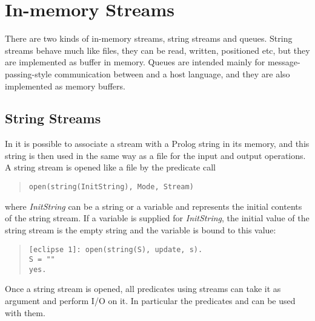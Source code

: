 \section{In-memory Streams}
There are two kinds of in-memory streams, string streams and queues.
String streams behave much like files, they can be read, written,
positioned etc, but they are implemented as buffer in memory.
Queues are intended mainly for message-passing-style communication
between \eclipse and a host language, and they are also implemented as
memory buffers.

\subsection{String Streams}
\label{stringio}
In {\eclipse} it is possible to associate a stream with a Prolog string
in its memory, and this string is then used in the same way as a file
for the input and output operations.
A string stream is opened like a file by the  predicate call
\begin{quote}\begin{verbatim}
open(string(InitString), Mode, Stream)
\end{verbatim}\end{quote}
where {\it InitString} can be a {\eclipse} string or a variable and represents
the initial contents of the string stream.
If a variable is supplied for {\it InitString}, the initial value of the string
stream is the empty string and the variable is bound to this value:
\begin{quote}\begin{verbatim}
[eclipse 1]: open(string(S), update, s).
S = ""
yes.
\end{verbatim}\end{quote} 
Once a string stream is opened, all predicates using streams
can take it as argument and perform I/O on it.
In particular the predicates
 and
can be used with them.

